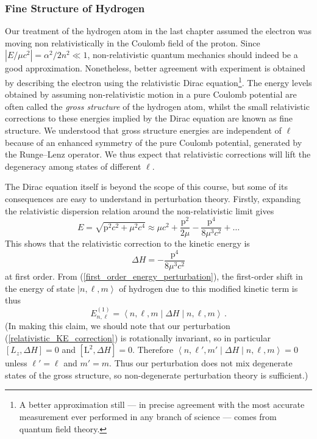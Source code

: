 \documentclass{article}
\theoremstyle{plain}\theoremheaderfont{\normalfont\itshape}\theorembodyfont{\rmfamily}\theoremseparator{.}\newtheorem*{rem}{Remark}\newtheorem*{ex}{Example}\newtheorem*{proof}{Proof}\newtheorem*{altp}{Alternative proof}
\theoremstyle{plain}\theoremheaderfont{\normalfont\bfseries}\theorembodyfont{\rmfamily}\theoremseparator{.}\newtheorem{thm}{Theorem}[section]\newtheorem{lem}[thm]{Lemma}\newtheorem{prop}[thm]{Proposition}\newtheorem*{cor}{Corollary}\newtheorem{defn}[thm]{Definition}\newtheorem{clm}[thm]{Claim}\newtheorem{clminproof}{Claim}
\theoremstyle{break}\theoremheaderfont{\normalfont\itshape}\theorembodyfont{\rmfamily}\theoremseparator{.\medskip}\newtheorem*{proofskip}{Proof}\newtheorem*{exs}{Examples}\newtheorem*{rems}{Remarks}
\theoremstyle{break}\theoremheaderfont{\normalfont\bfseries}\theorembodyfont{\rmfamily}\theoremseparator{.\medskip}\newtheorem{lemskip}[thm]{Lemma}\newtheorem{defnskip}[thm]{Definition}\newtheorem{propskip}[thm]{Proposition}\newtheorem{thmskip}[thm]{Theorem}
\numberwithin{equation}{section}
\newcommand{\ket}[1]{\left| #1 \right\rangle}
\newcommand{\mel}[3]{\left\langle #1 \middle| #2 \middle| #3 \right\rangle}
\newcommand{\expval}[2]{\left\langle #2 \middle| #1 \middle| #2 \right\rangle}
\newcommand{\vb}[1]{\bm{\mathrm{#1}}}
\newcommand{\abs}[1]{\left| #1 \right|}
\begin{document}
    \subsubsection{Fine Structure of Hydrogen}\label{Chap:Hydrogen_Fine_Structure}
    Our treatment of the hydrogen atom in the last chapter assumed the electron was moving non relativistically in the Coulomb field of the proton. Since \(\abs{E/\mu c^2}=\alpha^2/2n^2\ll 1\), non-relativistic quantum mechanics should indeed be a good approximation. Nonetheless, better agreement with experiment is obtained by describing the electron using the relativistic Dirac equation\footnote{A better approximation still --- in precise agreement with the most accurate measurement ever performed in any branch of science --- comes from quantum field theory.}. The energy levels obtained by assuming non-relativistic motion in a pure Coulomb potential are often called the \textit{gross structure} of the hydrogen atom, whilst the small relativistic corrections to these energies implied by the Dirac equation are known as fine structure. We understood that gross structure energies are independent of \(\ell\) because of an enhanced symmetry of the pure Coulomb potential, generated by the Runge--Lenz operator. We thus expect that relativistic corrections will lift the degeneracy among states of different \(\ell\).

    The Dirac equation itself is beyond the scope of this course, but some of its consequences are easy to understand in perturbation theory. Firstly, expanding the relativistic dispersion relation around the non-relativistic limit gives
    \begin{equation}\label{relativistic_energy}
        E=\sqrt{\vb{p}^2c^2+\mu^2 c^4}\approx\mu c^2+\frac{\vb{p}^2}{2\mu}-\frac{\vb{p}^4}{8\mu^3 c^2}+\dots
    \end{equation}
    This shows that the relativistic correction to the kinetic energy is
    \begin{equation}\label{relativistic_KE_correction}
        \Delta H=-\frac{\vb{p}^4}{8\mu^3 c^2}
    \end{equation}
    at first order. From (\ref{first_order_energy_perturbation}), the first-order shift in the energy of state \(\ket{n,\ell,m}\) of hydrogen due to this modified kinetic term is thus
    \begin{equation}
        E_{n,\ell}^{(1)}=\expval{\Delta H}{n,\ell,m}\,.
    \end{equation}
    (In making this claim, we should note that our perturbation (\ref{relativistic_KE_correction}) is rotationally invariant, so in particular \([L_z,\Delta H]=0\) and \([\vb{L}^2,\Delta H]=0\). Therefore \(\mel{n,\ell',m'}{\Delta H}{n,\ell,m}=0\) unless \(\ell'=\ell\) and \(m'=m\). Thus our perturbation does not mix degenerate states of the gross structure, so non-degenerate perturbation theory is sufficient.)
\end{document}

